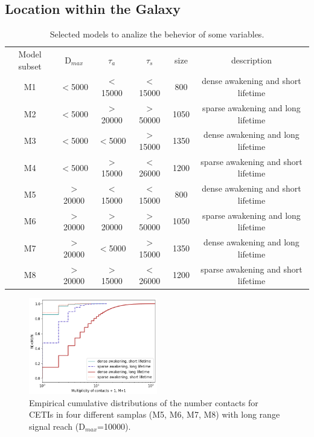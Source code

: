 \documentclass[crop]{CSLB}%
\begin{document}


\subsection{Location within the Galaxy}




 
\setlength{\tabcolsep}{10pt}
\begin{table}
\centering
\begin{tabular}{cccccc}
\hline
Model subset & D$_{max}$ & $\tau_a$ & $\tau_s$ & size & description  \\
M1 & $<$5000 & $<$15000 & $<$15000 &800  &dense awakening and short lifetime\\
M2 & $<$5000 & $>$20000 & $>$50000 &1050 &sparse awakening and long lifetime\\
M3 & $<$5000 & $<$5000  & $>$15000 &1350 &dense awakening and long lifetime \\
M4 & $<$5000 & $>$15000 & $<$26000 &1200 &sparse awakening and short lifetime\\

M5 & $>$20000 & $<$15000 & $<$15000 &800  &dense awakening and short lifetime\\
M6 & $>$20000 & $>$20000 & $>$50000 &1050 &sparse awakening and long lifetime\\
M7 & $>$20000 & $<$5000  & $>$15000 &1350 &dense awakening and long lifetime \\
M8 & $>$20000 & $>$15000 & $<$26000 &1200 &sparse awakening and short lifetime\\
\hline
\end{tabular}
\caption{Selected models to analize the behevior of some variables.}
\label{T_SelectedModels}
\end{table}



  
\begin{figure} \centering
   \includegraphics[width=0.5\textwidth]{Figure_1.png}
   \caption{Empirical cumulative distributions of the number contacts
   for CETIs in four different samplas (M5, M6, M7, M8) with long
   range signal reach (D$_{max}$=10000).
   }
\label{F_res_1} \end{figure}
   
\end{document}
